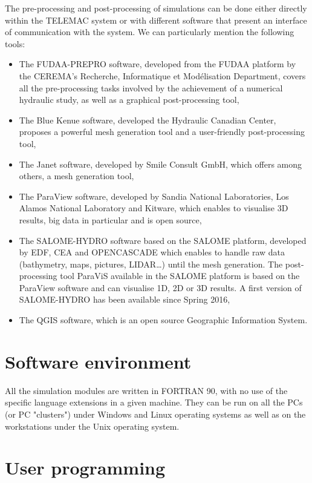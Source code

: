 The pre-processing and post-processing of simulations can be done either
directly within the TELEMAC system or with different software that present an
interface of communication with the system. We can particularly mention the
following tools:

\begin{itemize}
\item The FUDAA-PREPRO software, developed from the FUDAA platform
by the CEREMA's Recherche, Informatique et Modélisation Department, covers all
the pre-processing tasks involved by the achievement of a numerical hydraulic
study, as well as a graphical post-processing tool,
\item The Blue Kenue software, developed the Hydraulic Canadian
Center, proposes a powerful mesh generation tool and a user-friendly
post-processing tool,
\item The Janet software, developed by Smile Consult GmbH, which offers among
others, a mesh generation tool,
\item The ParaView software, developed by Sandia National Laboratories, Los
Alamos National Laboratory and Kitware, which enables to visualise 3D results,
big data in particular and is open source,
\item The SALOME-HYDRO software based on the SALOME platform, developed by EDF,
CEA and OPENCASCADE which enables to handle raw data (bathymetry, maps,
pictures, LIDAR\ldots) until the mesh generation.
The post-processing tool ParaViS available in the SALOME platform is based on
the ParaView software and can visualise 1D, 2D or 3D results.
A first version of SALOME-HYDRO has been available since Spring 2016,
\item The QGIS software, which is an open source Geographic Information System.
\end{itemize}


\section{Software environment}

All the simulation modules are written in FORTRAN 90, with no use of the
specific language extensions in a given machine. They can be run on all the PCs
(or PC "clusters") under Windows and Linux operating systems as well as on the
workstations under the Unix operating system.

\section{User programming}

